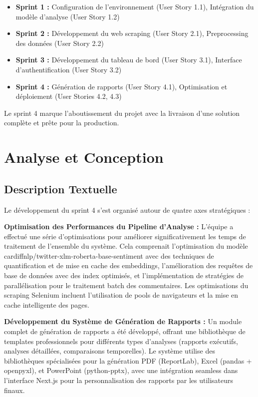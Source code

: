 \begin{itemize}
    \item \textbf{Sprint 1 :} Configuration de l'environnement (User Story 1.1), Intégration du modèle d'analyse (User Story 1.2)
    \item \textbf{Sprint 2 :} Développement du web scraping (User Story 2.1), Preprocessing des données (User Story 2.2)
    \item \textbf{Sprint 3 :} Développement du tableau de bord (User Story 3.1), Interface d'authentification (User Story 3.2)
    \item \textbf{Sprint 4 :} Génération de rapports (User Story 4.1), Optimisation et déploiement (User Stories 4.2, 4.3)
\end{itemize}

Le sprint 4 marque l'aboutissement du projet avec la livraison d'une solution complète et prête pour la production.

\section{Analyse et Conception}

\subsection{Description Textuelle}

Le développement du sprint 4 s'est organisé autour de quatre axes stratégiques :

\textbf{Optimisation des Performances du Pipeline d'Analyse :} L'équipe a effectué une série d'optimisations pour améliorer significativement les temps de traitement de l'ensemble du système. Cela comprenait l'optimisation du modèle cardiffnlp/twitter-xlm-roberta-base-sentiment avec des techniques de quantification et de mise en cache des embeddings, l'amélioration des requêtes de base de données avec des index optimisés, et l'implémentation de stratégies de parallélisation pour le traitement batch des commentaires. Les optimisations du scraping Selenium incluent l'utilisation de pools de navigateurs et la mise en cache intelligente des pages.

\textbf{Développement du Système de Génération de Rapports :} Un module complet de génération de rapports a été développé, offrant une bibliothèque de templates professionnels pour différents types d'analyses (rapports exécutifs, analyses détaillées, comparaisons temporelles). Le système utilise des bibliothèques spécialisées pour la génération PDF (ReportLab), Excel (pandas + openpyxl), et PowerPoint (python-pptx), avec une intégration seamless dans l'interface Next.js pour la personnalisation des rapports par les utilisateurs finaux.


